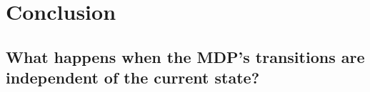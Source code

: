 \chapter{Conclusion}
\section{What happens when the MDP's transitions are independent of the current state?}

